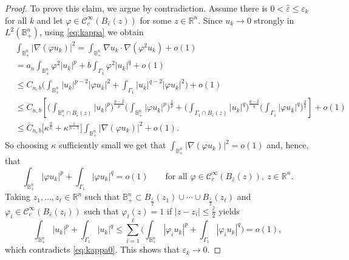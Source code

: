 \documentclass[reqno,11pt,oneside]{amsart}
\numberwithin{equation}{section}
\def\D{\mathbb{B}^n_+}
\def\rn{\mathbb{R}^n}
\def\eps{\varepsilon}
\def\vp{\varphi}
\def\cC{\mathcal{C}}
\def\what{\widehat}
\begin{document}
\begin{proof}
To prove this claim, we argue by contradiction. Assume there is $0<\what{\eps}\leq\eps_k$ for all $k$ and let $\vp\in\cC^\infty_c(B_{\what{\eps}}(z))$ for some $z\in\rn$. Since $u_k\to0$ strongly in $L^2(\D)$, using \eqref{eq:kappa} we obtain
\begin{align} \label{eq:eps_to_0}
&\int_{\D}|\nabla(\vp u_k)|^2=\int_{\D}\nabla u_k\cdot\nabla(\vp^2 u_k) + o(1) \nonumber \\
&=a_n\int_{\D}\vp^2|u_k|^p+b\int_{\Gamma_1}\vp^2|u_k|^q+o(1)  \nonumber \\
&\leq C_{n,b}\Big(\int_{\D}|u_k|^{p-2}|\vp u_k|^2+\int_{\Gamma_1}|u_k|^{q-2}|\vp u_k|^2\Big)+o(1) \nonumber  \\
&\leq C_{n,b}\left[\Big(\int_{\D\cap B_{\what{\eps}}(z)}|u_k|^p\Big)^\frac{p-2}{p}\Big(\int_{\D}|\vp u_k|^p\Big)^\frac{2}{p} + \Big(\int_{\Gamma_1\cap B_{\what{\eps}}(z)}|u_k|^q\Big)^\frac{q-2}{q}\Big(\int_{\Gamma_1}|\vp u_k|^q\Big)^\frac{2}{q}\right] + o(1) \nonumber  \\
&\leq \overline{C}_{n,b} \Big[\kappa^\frac{2}{n} + \kappa^\frac{1}{n-1}\Big]\int_{\D}|\nabla(\vp u_k)|^2 + o(1).
\end{align}
So choosing $\kappa$ sufficiently small we get that $\int_{\D}|\nabla(\vp u_k)|^2 = o(1)$ and, hence, that
$$\int_{\D}|\vp u_k|^p+\int_{\Gamma_1}|\vp u_k|^q=o(1)\qquad\text{for all \ }\vp\in\cC^\infty_c(B_{\what{\eps}}(z)), \ z\in\rn.$$
Taking $z_1,\ldots,z_\ell\in\rn$ such that $\D\subset B_\frac{\what\eps}{2}(z_1)\cup\cdots\cup B_\frac{\what\eps}{2}(z_\ell)$ and $\vp_i\in\cC^\infty_c(B_{\what{\eps}}(z_i))$ such that $\vp_i(z)=1$ if $|z-z_i|\leq\frac{\what\eps}{2}$ yields
$$\int_{\D}|u_k|^p+\int_{\Gamma_1}|u_k|^q\leq\sum_{i=1}^\ell\Big(\int_{\D}|\vp_iu_k|^p+\int_{\Gamma_1}|\vp_iu_k|^q\Big)=o(1),$$
which contradicts \eqref{eq:kappa0}. This shows that $\eps_k\to 0$.


\end{proof}
\end{document}
